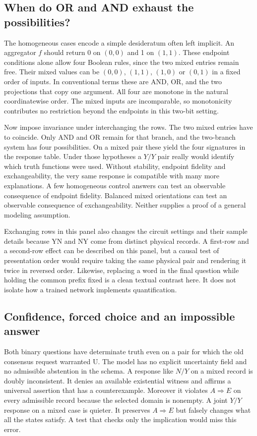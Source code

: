 \documentclass[12pt,letterpaper]{article}
\begin{document}
\subsection{When do OR and AND exhaust the possibilities?}
The homogeneous cases encode a simple desideratum often left implicit. An aggregator $f$ should return 0 on $(0,0)$ and 1 on $(1,1)$. These endpoint conditions alone allow four Boolean rules, since the two mixed entries remain free. Their mixed values can be $(0,0)$, $(1,1)$, $(1,0)$ or $(0,1)$ in a fixed order of inputs. In conventional terms these are AND, OR, and the two projections that copy one argument. All four are monotone in the natural coordinatewise order. The mixed inputs are incomparable, so monotonicity contributes no restriction beyond the endpoints in this two-bit setting.

Now impose invariance under interchanging the rows. The two mixed entries have to coincide. Only AND and OR remain for that branch, and the two-branch system has four possibilities. On a mixed pair these yield the four signatures in the response table. Under those hypotheses a $Y/Y$ pair really would identify which truth functions were used. Without stability, endpoint fidelity and exchangeability, the very same response is compatible with many more explanations. A few homogeneous control answers can test an observable consequence of endpoint fidelity. Balanced mixed orientations can test an observable consequence of exchangeability. Neither supplies a proof of a general modeling assumption.

Exchanging rows in this panel also changes the circuit settings and their sample details because YN and NY come from distinct physical records. A first-row and a second-row effect can be described on this panel, but a causal test of presentation order would require taking the same physical pair and rendering it twice in reversed order. Likewise, replacing a word in the final question while holding the common prefix fixed is a clean textual contrast here. It does not isolate how a trained network implements quantification.

\subsection{Confidence, forced choice and an impossible answer}
Both binary questions have determinate truth even on a pair for which the old consensus request warranted U. The model has no explicit uncertainty field and no admissible abstention in the schema. A response like $N/Y$ on a mixed record is doubly inconsistent. It denies an available existential witness and affirms a universal assertion that has a counterexample. Moreover it violates $A\Rightarrow E$ on every admissible record because the selected domain is nonempty. A joint $Y/Y$ response on a mixed case is quieter. It preserves $A\Rightarrow E$ but falsely changes what all the states satisfy. A test that checks only the implication would miss this error.
\end{document}
